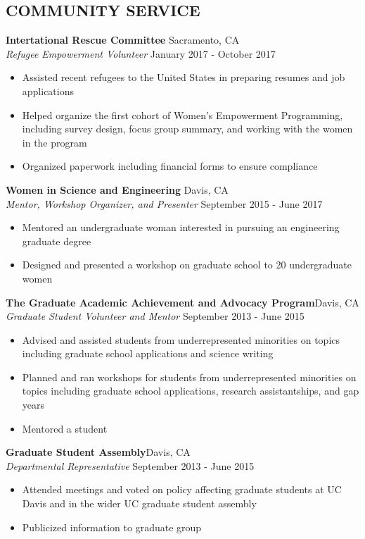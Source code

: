 \documentclass[line,margin,10pt]{res}
\begin{document}
\begin{resume}
\section{COMMUNITY SERVICE}
\textbf{Intertational Rescue Committee}\hfill
Sacramento, CA\\
{\sl Refugee Empowerment Volunteer} \hfill January 2017 - October 2017
\begin{itemize}
\item Assisted recent refugees to the United States in preparing resumes and job applications
\item Helped organize the first cohort of Women's Empowerment Programming, including survey design, focus group summary, and working with the women in the program
\item Organized paperwork including financial forms to ensure compliance %
\end{itemize}

\textbf{Women in Science and Engineering}\hfill
Davis, CA\\
{\sl Mentor, Workshop Organizer, and Presenter} \hfill September 2015 - June 2017
\begin{itemize}
\item Mentored an undergraduate woman interested in pursuing an engineering graduate degree
\item Designed and presented a workshop on graduate school to 20 undergraduate women
\end{itemize}

\textbf{The Graduate Academic Achievement and Advocacy Program}\hfill Davis, CA\\{\sl Graduate Student Volunteer and Mentor} \hfill September 2013 - June 2015
\begin{itemize}
\item Advised and assisted students from underrepresented minorities on topics including graduate school applications and science writing
\item Planned and ran workshops for students from underrepresented minorities on topics including graduate school applications, research assistantships, and gap years
\item Mentored a student
\end{itemize}

\textbf{Graduate Student Assembly}\hfill Davis, CA\\{\sl Departmental Representative} \hfill September 2013 - June 2015
\begin{itemize}
\item Attended meetings and voted on policy affecting graduate students at UC Davis and in the wider UC graduate student assembly
\item Publicized information to graduate group
\end{itemize}
 

\end{resume}
\end{document}
